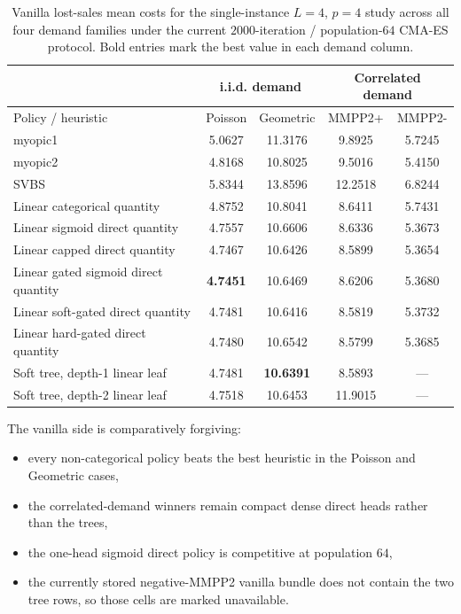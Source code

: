 \documentclass[11pt]{article}
\begin{document}
\begin{table}[t]
\centering
\small
\caption{Vanilla lost-sales mean costs for the single-instance $L=4$, $p=4$ study across all
four demand families under the current $2000$-iteration / population-$64$ CMA-ES protocol. Bold
entries mark the best value in each demand column.}
\label{tab:vanilla-l4-demand-table}
\begin{tabular}{|l||c|c||c|c|}
\hline
 & \multicolumn{2}{c||}{i.i.d. demand} & \multicolumn{2}{c|}{Correlated demand} \\
\hline
Policy / heuristic & Poisson & Geometric & MMPP2+ & MMPP2- \\
\hline
myopic1 & 5.0627 & 11.3176 & 9.8925 & 5.7245 \\
myopic2 & 4.8168 & 10.8025 & 9.5016 & 5.4150 \\
SVBS & 5.8344 & 13.8596 & 12.2518 & 6.8244 \\
\hline
Linear categorical quantity & 4.8752 & 10.8041 & 8.6411 & 5.7431 \\
Linear sigmoid direct quantity & 4.7557 & 10.6606 & 8.6336 & 5.3673 \\
Linear capped direct quantity & 4.7467 & 10.6426 & 8.5899 & 5.3654 \\
Linear gated sigmoid direct quantity & \textbf{4.7451} & 10.6469 & 8.6206 & 5.3680 \\
Linear soft-gated direct quantity & 4.7481 & 10.6416 & 8.5819 & 5.3732 \\
Linear hard-gated direct quantity & 4.7480 & 10.6542 & 8.5799 & 5.3685 \\
Soft tree, depth-1 linear leaf & 4.7481 & \textbf{10.6391} & 8.5893 & --- \\
Soft tree, depth-2 linear leaf & 4.7518 & 10.6453 & 11.9015 & --- \\
\hline
\end{tabular}
\end{table}

The vanilla side is comparatively forgiving:
\begin{itemize}
    \item every non-categorical policy beats the best heuristic in the Poisson and Geometric
    cases,
    \item the correlated-demand winners remain compact dense direct heads rather than the trees,
    \item the one-head sigmoid direct policy is competitive at population $64$,
    \item the currently stored negative-MMPP2 vanilla bundle does not contain the two tree rows,
    so those cells are marked unavailable.
\end{itemize}
\end{document}
